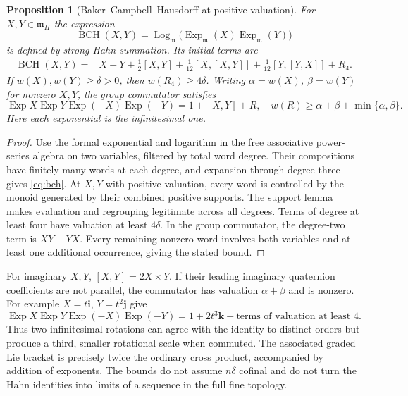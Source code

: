 \documentclass[11pt,letterpaper]{article}
\numberwithin{equation}{section}
\newtheorem{proposition}[proposition]{Proposition}
\theoremstyle{definition}
\theoremstyle{remark}
\newcommand{\mm}{\mathfrak m}
\newcommand{\ii}{\mathbf i}
\newcommand{\jj}{\mathbf j}
\newcommand{\kk}{\mathbf k}
\newcommand{\Exp}{\operatorname{Exp}}
\newcommand{\Log}{\operatorname{Log}}
\newcommand{\BCH}{\operatorname{BCH}}
\begin{document}
\begin{proposition}[Baker--Campbell--Hausdorff at positive valuation]\label{prop:bch}
For $X,Y\in\mm_H$ the expression
\[
 \BCH(X,Y)=\Log_{\mm}\bigl(\Exp_{\mm}(X)\Exp_{\mm}(Y)\bigr)
\]
is defined by strong Hahn summation. Its initial terms are
\begin{align}\label{eq:bch}
 \BCH(X,Y)={}&X+Y+\tfrac12[X,Y]
 +\tfrac1{12}[X,[X,Y]]+\tfrac1{12}[Y,[Y,X]]+R_4.
\end{align}
If $w(X),w(Y)\ge\delta>0$, then $w(R_4)\ge4\delta$.
Writing $\alpha=w(X)$, $\beta=w(Y)$ for nonzero $X,Y$, the group commutator satisfies
\begin{equation}\label{eq:groupcomm}
 \Exp X\Exp Y\Exp(-X)\Exp(-Y)
 =1+[X,Y]+R,
 \quad w(R)\ge\alpha+\beta+\min\{\alpha,\beta\}.
\end{equation}
Here each exponential is the infinitesimal one.
\end{proposition}
\begin{proof}
Use the formal exponential and logarithm in the free associative power-series algebra on
two variables, filtered by total word degree. Their compositions have finitely many words
at each degree, and expansion through degree three gives \eqref{eq:bch}. At $X,Y$ with
positive valuation, every word is controlled by the monoid generated by their combined
positive supports. The support lemma makes evaluation and regrouping legitimate across
all degrees. Terms of degree at least four have valuation at least $4\delta$.
In the group commutator, the degree-two term is $XY-YX$. Every remaining nonzero word
involves both variables and at least one additional occurrence, giving the stated bound.
\end{proof}

For imaginary $X,Y$, $[X,Y]=2X\times Y$. If their leading imaginary quaternion coefficients
are not parallel, the commutator has valuation $\alpha+\beta$ and is nonzero. For example
$X=t\ii$, $Y=t^2\jj$ give
\[
 \Exp X\Exp Y\Exp(-X)\Exp(-Y)=1+2t^3\kk+
 \text{terms of valuation at least }4.
\]
Thus two infinitesimal rotations can agree with the identity to distinct orders but produce a
third, smaller rotational scale when commuted. The associated graded Lie bracket is precisely
twice the ordinary cross product, accompanied by addition of exponents.
The bounds do not assume $n\delta$ cofinal and do not turn the Hahn identities into limits
of a sequence in the full fine topology.
\end{document}
